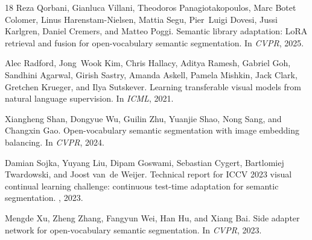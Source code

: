 \documentclass{article}
\begin{document}
\begin{thebibliography}{18}
Reza Qorbani, Gianluca Villani, Theodoros Panagiotakopoulos, Marc Botet
  Colomer, Linus Harenstam-Nielsen, Mattia Segu, Pier~Luigi Dovesi, Jussi
  Karlgren, Daniel Cremers, and Matteo Poggi.
\newblock Semantic library adaptation: LoRA retrieval and fusion for
  open-vocabulary semantic segmentation.
\newblock In {\em CVPR}, 2025.

Alec Radford, Jong~Wook Kim, Chris Hallacy, Aditya Ramesh, Gabriel Goh,
  Sandhini Agarwal, Girish Sastry, Amanda Askell, Pamela Mishkin, Jack Clark,
  Gretchen Krueger, and Ilya Sutskever.
\newblock Learning transferable visual models from natural language
  supervision.
\newblock In {\em ICML}, 2021.

Xiangheng Shan, Dongyue Wu, Guilin Zhu, Yuanjie Shao, Nong Sang, and Changxin
  Gao.
\newblock Open-vocabulary semantic segmentation with image embedding
  balancing.
\newblock In {\em CVPR}, 2024.

Damian Sojka, Yuyang Liu, Dipam Goswami, Sebastian Cygert, Bartlomiej
  Twardowski, and Joost van~de Weijer.
\newblock Technical report for ICCV 2023 visual continual learning challenge:
  continuous test-time adaptation for semantic segmentation.
, 2023.

Mengde Xu, Zheng Zhang, Fangyun Wei, Han Hu, and Xiang Bai.
\newblock Side adapter network for open-vocabulary semantic segmentation.
\newblock In {\em CVPR}, 2023.

\end{thebibliography}
\end{document}
